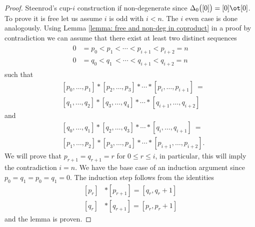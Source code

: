 \begin{proof}
	Steenrod's cup-$i$ construction if non-degenerate since $\Delta_0\big([0]\big) = [0] \ot [0]$. To prove it is free let us assume $i$ is odd with $i < n$. The $i$ even case is done analogously. Using Lemma \ref{lemma: free and non-deg in coproduct} in a proof by contradiction we can assume that there exist at least two distinct sequences
	\begin{align*}
	\begin{split}
	0 &= p_0 < p_1 < \cdots < p_{i+1} < p_{i+2} = n \\
	0 &= q_0 < q_1 \,< \cdots < q_{i+1} < q_{i+2} = n
	\end{split}
	\end{align*}
	such that
	\[
	\begin{split}
	&[ {p_0}, \dots, {p_1} ] \ast [ {p_2}, \dots, {p_3} ] \ast \cdots \ast [ {p_{i}}, \dots, {p_{i+1}} ]\ = \\
	&[ {q_1}, \dots, {q_2} ] \ast [ {q_3}, \dots, {q_4} ] \ast \cdots \ast [ {q_{i+1}}, \dots, {q_{i+2}} ]
	\end{split}
	\]
	and
	\[
	\begin{split}
	&[ {q_0}, \dots, {q_1} ] \ast [ {q_2}, \dots, {q_3} ] \ast \cdots \ast [ {q_{i}}, \dots, {q_{i+1}} ]\ = \\
	&[ {p_1}, \dots, {p_2} ] \ast [ {p_3}, \dots, {p_4} ] \ast \cdots \ast [ {p_{i+1}}, \dots, {p_{i+2}} ].
	\end{split}
	\]
	We will prove that $p_{r+1} = q_{r+1} = r$ for $0 \leq r \leq i$, in particular, this will imply the contradiction $i = n$. We have the base case of an induction argument since ${p_0} = {q_1} = {p_0} = {q_1} = 0$. The induction step follows from the identities
	\[
	\begin{split}
	[p_r] &\ast [p_{r+1}] = [q_r, q_{r}+1]\\
	[q_r] &\ast [q_{r+1}] = [p_r, p_{r}+1]
	\end{split}
	\]
	and the lemma is proven.
\end{proof}
\fi